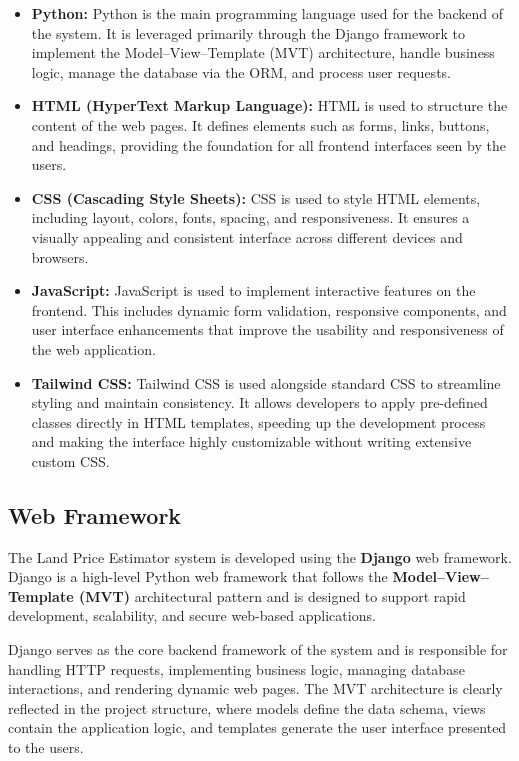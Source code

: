 \documentclass[12pt,oneside]{report}
\begin{document}
\begin{itemize}[leftmargin=*, itemsep=3pt]
    \item \textbf{Python:} Python is the main programming language used for the backend of the system. It is leveraged primarily through the Django framework to implement the Model–View–Template (MVT) architecture, handle business logic, manage the database via the ORM, and process user requests.

    \item \textbf{HTML (HyperText Markup Language):} HTML is used to structure the content of the web pages. It defines elements such as forms, links, buttons, and headings, providing the foundation for all frontend interfaces seen by the users.

    \item \textbf{CSS (Cascading Style Sheets):} CSS is used to style HTML elements, including layout, colors, fonts, spacing, and responsiveness. It ensures a visually appealing and consistent interface across different devices and browsers.

    \item \textbf{JavaScript:} JavaScript is used to implement interactive features on the frontend. This includes dynamic form validation, responsive components, and user interface enhancements that improve the usability and responsiveness of the web application.

    \item \textbf{Tailwind CSS:} Tailwind CSS is used alongside standard CSS to streamline styling and maintain consistency. It allows developers to apply pre-defined classes directly in HTML templates, speeding up the development process and making the interface highly customizable without writing extensive custom CSS.
\end{itemize}


\subsection{Web Framework}

The Land Price Estimator system is developed using the \textbf{Django} web framework. Django is a high-level Python web framework that follows the \textbf{Model--View--Template (MVT)} architectural pattern and is designed to support rapid development, scalability, and secure web-based applications.

Django serves as the core backend framework of the system and is responsible for handling HTTP requests, implementing business logic, managing database interactions, and rendering dynamic web pages. The MVT architecture is clearly reflected in the project structure, where models define the data schema, views contain the application logic, and templates generate the user interface presented to the users.
\end{document}
